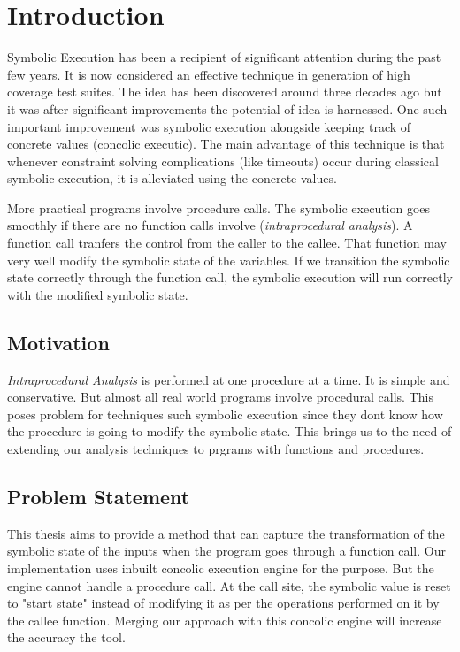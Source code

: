 \documentclass[12pt,oneside]{book}
\begin{document}
\chapter{Introduction}


\hspace {0.4 cm}
Symbolic Execution has been a recipient of significant attention during the past few years. It is now considered an effective technique in generation of high coverage test suites. The idea has been discovered around three decades ago but it was after significant improvements the potential of idea is harnessed. One such important improvement was symbolic execution alongside keeping track of concrete values (concolic executic). The main advantage of this technique is that whenever constraint solving complications (like timeouts) occur during classical symbolic execution, it is alleviated using the concrete values.

More practical programs involve procedure calls. The symbolic execution goes smoothly if there are no function calls involve (\textit{intraprocedural analysis}). A function call tranfers the control from the caller to the callee. That function may very well modify the symbolic state of the variables. If we transition the symbolic state correctly through the function call, the symbolic execution will run correctly with the modified symbolic state.   


\section{Motivation}
\textit{Intraprocedural Analysis} is performed at one procedure at a time. It is simple and conservative. But almost all real world programs involve procedural calls. This poses problem for techniques such symbolic execution since they dont know how the procedure is going to modify the symbolic state. This brings us to the need of extending our analysis techniques to prgrams with functions and procedures.


\section{Problem Statement}
This thesis aims to provide a method that can capture the transformation of the symbolic state of the inputs when the program goes through a function call. Our implementation uses inbuilt concolic execution engine for the purpose. But the engine cannot handle a procedure call. At the call site, the symbolic value is reset to "start state" instead of modifying it as per the operations performed on it by the callee function. Merging our approach with this concolic engine will increase the accuracy the tool. 
\end{document}
